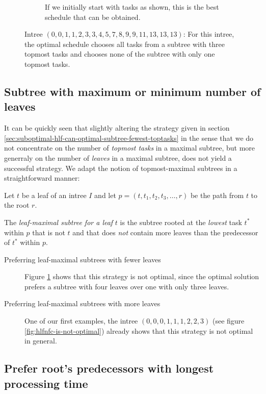 \begin{figure}[ht]
\begin{subfigure}{.45\textwidth}
    \caption{If we initially start with tasks as shown, this is the best schedule that can be obtained.}
  \end{subfigure}
  \caption{Intree $(0,0,1,1,2,3,3,4,5,7,8,9,9,11,13,13,13)$: For this intree, the optimal schedule chooses all tasks from a subtree with three topmost tasks and chooses none of the subtree with only one topmost tasks.}
  \label{fig:subtree-with-fewest-toptasks-suboptimal}
\end{figure}

\subsection{Subtree with maximum or minimum number of leaves}
\label{sec:suboptimal-hlf-can-optimal-subtree-fewest-leaves}

It can be quickly seen that slightly altering the strategy given in section \ref{sec:suboptimal-hlf-can-optimal-subtree-fewest-toptasks} in the sense that we do not concentrate on the number of \emph{topmost tasks} in a maximal subtree, but more generraly on the number of \emph{leaves} in a maximal subtree, does not yield a successful strategy. We adapt the notion of topmost-maximal subtrees in a straightforward manner:

\begin{definition}
  Let $t$ be a leaf of an intree $I$ and let $p=(t, t_1, t_2, t_3, \dots, r)$ be the path from $t$ to the root $r$.

  The \emph{leaf-maximal subtree for a leaf} $t$ is the subtree rooted at the \emph{lowest} task $t^*$ within $p$ that is not $t$ and that does \emph{not} contain more leaves than the predecessor of $t^*$ within $p$.
\end{definition}

\begin{description}
\item [Preferring leaf-maximal subtrees with fewer leaves] Figure \ref{fig:subtree-with-fewest-toptasks-suboptimal} shows that this strategy is not optimal, since the optimal solution prefers a subtree with four leaves over one with only three leaves.
\item [Preferring leaf-maximal subtrees with more leaves] One of our first examples, the intree $(0,0,0,1,1,1,2,2,3)$ (see figure \ref{fig:hlfnfc-is-not-optimal}) already shows that this strategy is not optimal in general.
\end{description}

\subsection{Prefer root's predecessors with longest processing time}
\label{sec:suboptimal-hlf-can-roots-longest-predecessors}

